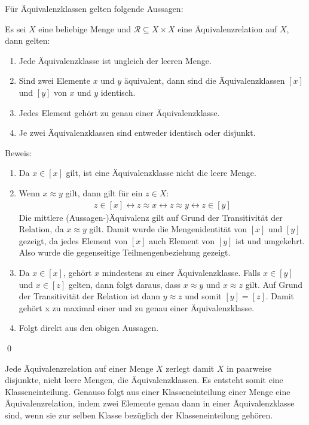 \begin{Unit}[Bemerkung]
Für Äquivalenzklassen gelten folgende Aussagen:

\begin{Bemerkung}
  Es sei $X$ eine beliebige Menge und $\mathcal{R} \subseteq X \times X$ eine 
  Äquivalenzrelation auf $X$, dann gelten:
  \begin{enumerate}
    \item Jede Äquivalenzklasse ist ungleich der leeren Menge. 
    \item Sind zwei Elemente $x$ und $y$ äquivalent, dann sind die 
      Äquivalenzklassen $[x]$ und $[y]$ von $x$ und $y$ identisch. 
    \item Jedes Element gehört zu genau einer Äquivalenzklasse.
    \item Je zwei Äquivalenzklassen sind entweder identisch oder disjunkt.
  \end{enumerate}
\end{Bemerkung}

Beweis:
\begin{enumerate}
  \item Da $x \in [x]$ gilt, ist eine Äquivalenzklasse nicht die leere Menge.
  \item Wenn $x \approx y$ gilt, dann gilt für ein $z \in X$:
    \begin{align}
      z \in [x] \leftrightarrow z \approx x \leftrightarrow z \approx y 
      \leftrightarrow z \in [y]
    \end{align}
    Die mittlere (Aussagen-)Äquivalenz gilt auf Grund der Transitivität der 
    Relation, da $x \approx y$ gilt. Damit wurde die Mengenidentität von 
    $[x]$ und $[y]$ gezeigt, da jedes Element von $[x]$ auch Element von 
    $[y]$ ist und umgekehrt. Also wurde die gegenseitige Teilmengenbeziehung
    gezeigt.
  \item Da $x \in [x]$, gehört $x$ mindestens zu einer Äquivalenzklasse. 
    Falls $x \in [y]$ und $x \in [z]$ gelten, dann folgt daraus, dass 
    $x \approx y$ und $x \approx z$ gilt. Auf Grund der Transitivität der 
    Relation ist dann $y \approx z$ und somit $[y] = [z]$. Damit gehört x zu 
    maximal einer und zu genau einer Äquivalenzklasse.
  \item Folgt direkt aus den obigen Aussagen.
\end{enumerate}\qed
\end{Unit}

\begin{Unit}[Anmerkung]
Jede Äquivalenzrelation auf einer Menge $X$ zerlegt damit $X$ in paarweise
disjunkte, nicht leere Mengen, die Äquivalenzklassen. Es entsteht somit eine 
Klasseneinteilung. Genauso folgt aus einer Klasseneinteilung einer Menge eine 
Äquivalenzrelation, indem zwei Elemente genau dann in einer Äquivalenzklasse 
sind, wenn sie zur selben Klasse bezüglich der Klasseneinteilung gehören.
\end{Unit}

